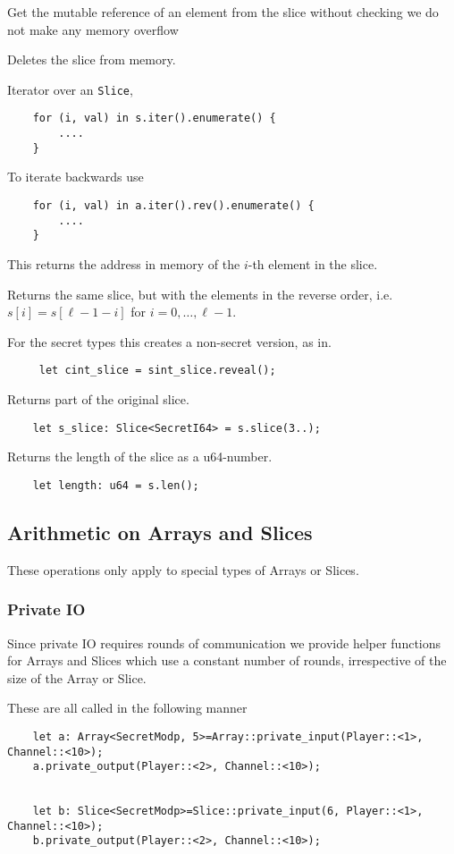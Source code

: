 Get the mutable reference of an element from the slice without checking we do not make any memory overflow

Deletes the slice from memory.


Iterator over an \verb|Slice|,
\begin{lstlisting}
    for (i, val) in s.iter().enumerate() {
        ....
    }
\end{lstlisting}
To iterate backwards use
\begin{lstlisting}
    for (i, val) in a.iter().rev().enumerate() {
        ....
    }
\end{lstlisting}

This returns the address in memory of the $i$-th element in the slice.

Returns the same slice, but with the elements in the reverse order, i.e.
$s[i] = s[\ell-1-i]$ for $i=0,\ldots,\ell-1$.

For the secret types this creates a non-secret version, as in.
\begin{lstlisting}
     let cint_slice = sint_slice.reveal();
\end{lstlisting}

Returns part of the original slice.
\begin{lstlisting}
    let s_slice: Slice<SecretI64> = s.slice(3..);
\end{lstlisting}

Returns the length of the slice as a u64-number.
\begin{lstlisting}
    let length: u64 = s.len();
\end{lstlisting}

\subsection{Arithmetic on Arrays and Slices}
These operations only apply to special types of Arrays or Slices.

\subsubsection{Private IO}
Since private IO requires rounds of communication we provide helper functions
for Arrays and Slices which use a constant number of rounds, irrespective of the
size of the Array or Slice.

These are all called in the following manner
\begin{lstlisting}
    let a: Array<SecretModp, 5>=Array::private_input(Player::<1>, Channel::<10>);
    a.private_output(Player::<2>, Channel::<10>);


    let b: Slice<SecretModp>=Slice::private_input(6, Player::<1>, Channel::<10>);
    b.private_output(Player::<2>, Channel::<10>);
\end{lstlisting}

